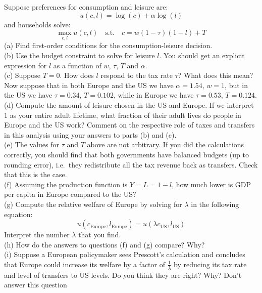 \documentclass[12pt, letterpaper]{article}
\begin{document}
\begin{tcolorbox}[oddbox,title={Problem 7.5 \quad Prescott's Calculation}]
\begin{tcolorbox}[questionbox]
Suppose preferences for consumption and leisure are:
\[u(c,l)=\log(c)+\alpha\log(l)\]
and households solve:
\[\max_{c,l}u(c,l)\quad\text{s.t.}\quad c=w(1-\tau)(1-l)+T\]
(a) Find first-order conditions for the consumption-leisure decision.\\
(b) Use the budget constraint to solve for leisure $l$. You should get an explicit expression
for $l$ as a function of $w$, $\tau$, $T$ and $\alpha$.\\
(c) Suppose $T=0$. How does $l$ respond to the tax rate $\tau$? What does this mean?\\[3pt]
Now suppose that in both Europe and the US we have $\alpha=1.54$, $w=1$, but in the US we
have $\tau=0.34$, $T=0.102$, while in Europe we have $\tau=0.53$, $T=0.124$.\\[3pt]
(d) Compute the amount of leisure chosen in the US and Europe. If we interpret 1 as your
entire adult lifetime, what fraction of their adult lives do people in Europe and the US
work? Comment on the respective role of taxes and transfers in this analysis using your
answers to parts (b) and (c).\\
(e) The values for $\tau$ and $T$ above are not arbitrary. If you did the calculations
correctly, you should find that both governments have balanced budgets (up to rounding
error), i.e.\ they redistribute all the tax revenue back as transfers. Check that this is the
case.\\
(f) Assuming the production function is $Y=L=1-l$, how much lower is GDP per capita in Europe
compared to the US?\\
(g) Compute the relative welfare of Europe by solving for $\lambda$ in the following equation:
\[u(c_{\text{Europe}},l_{\text{Europe}})=u(\lambda c_{\text{US}},l_{\text{US}})\]
Interpret the number $\lambda$ that you find.\\
(h) How do the answers to questions (f) and (g) compare? Why?\\
(i) Suppose a European policymaker sees Prescott's calculation and concludes that Europe could
increase its welfare by a factor of $\frac{1}{\lambda}$ by reducing its tax rate and level of
transfers to US levels. Do you think they are right? Why? Don't answer this question

\end{tcolorbox}
\end{tcolorbox}
\end{document}
